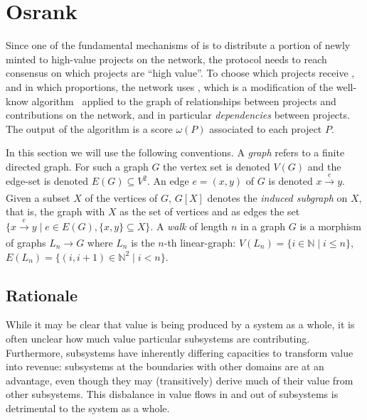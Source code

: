 \section{Osrank}
\label{s:osrank}


\def\Graph{\mathsf{Graph}}
\def\proj{\mathsf{proj}}
\def\user{\mathsf{user}}
\def\dep{\mathsf{dep}}
\def\own{\mathsf{own}}
\def\coown{\mathsf{own}^\circ}
\def\contrib{\mathsf{contrib}}
\def\cocontrib{\mathsf{contrib}^\circ}

Since one of the fundamental mechanisms of \oscoin{} is to distribute a portion
of newly minted \oscoin{} to high-value projects on the network, the protocol
needs to reach consensus on which projects are ``high value''. To choose which
projects receive \oscoin{}, and in which proportions, the network uses
\osrank{}, which is a modification of the well-know \pagerank{}
algorithm~\cite{pagerank} applied to the graph of relationships between
projects and contributions on the network, and in particular
\emph{dependencies} between projects. The output of the algorithm is a score
$\omega(P)$ associated to each project $P$.

In this section we will use the following conventions. A \emph{graph} refers to
a finite directed graph. For such a graph $G$ the vertex set is denoted $V(G)$
and the edge-set is denoted $E(G) \subseteq V^2$. An edge $e = (x,y)$ of $G$ is
denoted $x \xrightarrow[]{e} y$. Given a subset $X$ of the vertices of $G$,
$G[X]$ denotes the \emph{induced subgraph} on $X$, that is, the graph with $X$
as the set of vertices and as edges the set
$\{ x \xrightarrow[]{e} y \mid e \in E(G), \{x,y\} \subseteq X\}$. A \emph{walk}
of length $n$ in a graph $G$ is a morphism of graphs $L_n \to G$ where $L_n$ is
the $n$-th linear-graph: $V(L_n) = \{i \in \mathbb{N} \mid i \leq n \}$,
$E(L_n) = \{ (i,i+1) \in \mathbb{N}^2 \mid i < n \}$.

\subsection{Rationale}

While it may be clear that value is being produced by a system as a whole, it is
often unclear how much value particular subsystems are
contributing. Furthermore, subsystems have inherently differing capacities to
transform value into revenue: subsystems at the boundaries with other domains
are at an advantage, even though they may (transitively) derive much of their
value from other subsystems. This disbalance in value flows in and out of
subsystems is detrimental to the system as a whole.

